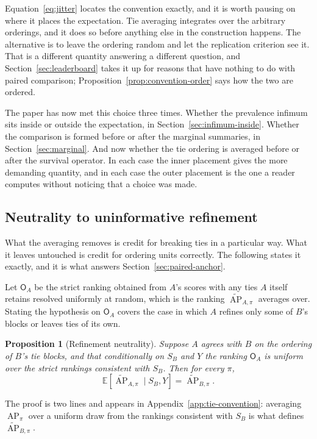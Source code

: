 \documentclass[11pt]{article}
\newcommand{\AP}{\operatorname{AP}}
\newcommand{\E}{\mathbb{E}}
\newcommand{\APta}{\widetilde{\AP}}
\newcommand{\Rank}{\mathsf{O}}
\newtheorem{proposition}{Proposition}
\theoremstyle{remark}
\begin{document}
Equation~\eqref{eq:jitter} locates the convention exactly, and it is worth pausing on where it places the expectation. Tie averaging integrates over the arbitrary orderings, and it does so before anything else in the construction happens. The alternative is to leave the ordering random and let the replication criterion see it. That is a different quantity answering a different question, and Section~\ref{sec:leaderboard} takes it up for reasons that have nothing to do with paired comparison; Proposition~\ref{prop:convention-order} says how the two are ordered.

The paper has now met this choice three times. Whether the prevalence infimum sits inside or outside the expectation, in Section~\ref{sec:infimum-inside}. Whether the comparison is formed before or after the marginal summaries, in Section~\ref{sec:marginal}. And now whether the tie ordering is averaged before or after the survival operator. In each case the inner placement gives the more demanding quantity, and in each case the outer placement is the one a reader computes without noticing that a choice was made.

\subsection{Neutrality to uninformative refinement}
\label{sec:refinement}

What the averaging removes is credit for breaking ties in a particular way. What it leaves untouched is credit for ordering units correctly. The following states it exactly, and it is what answers Section~\ref{sec:paired-anchor}.

Let $\Rank_A$ be the strict ranking obtained from $A$'s scores with any ties $A$ itself retains resolved uniformly at random, which is the ranking $\APta_{A,\pi}$ averages over. Stating the hypothesis on $\Rank_A$ covers the case in which $A$ refines only some of $B$'s blocks or leaves ties of its own.

\begin{proposition}[Refinement neutrality]
\label{prop:refinement}
Suppose $A$ agrees with $B$ on the ordering of $B$'s tie blocks, and that conditionally on $S_B$ and $Y$ the ranking $\Rank_A$ is uniform over the strict rankings consistent with $S_B$. Then for every $\pi$,
\[
\E\left[\APta_{A,\pi}\mid S_B,Y\right]
=
\APta_{B,\pi}.
\]
\end{proposition}

The proof is two lines and appears in Appendix~\ref{app:tie-convention}: averaging $\AP_\pi$ over a uniform draw from the rankings consistent with $S_B$ is what defines $\APta_{B,\pi}$.
\end{document}
